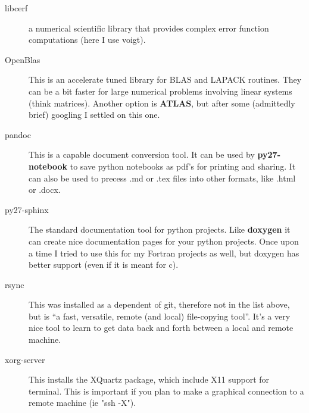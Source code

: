\documentclass[11pt, A4paper]{article}
\begin{document}
\begin{description}
\item[libcerf] a numerical scientific library that provides complex error function computations (here I use voigt).

\item[OpenBlas] This is an accelerate tuned library for BLAS and LAPACK routines. 
They can be a bit faster for large numerical problems involving linear systems (think matrices). 
Another option is {\bf ATLAS}, but after some (admittedly brief) googling I settled on this one. 

\item[pandoc] This is a capable document conversion tool. 
It can be used by {\bf py27-notebook} to save python notebooks as pdf's for printing and sharing. 
It can also be used to precess .md or .tex files into other formats, like .html or .docx.

\item[py27-sphinx] The standard documentation tool for python projects. 
Like {\bf doxygen} it can create nice documentation pages for your python projects. 
Once upon a time I tried to use this for my Fortran projects as well, but doxygen has better support (even if it is meant for c).

\item[rsync] This was installed as a dependent of git, therefore not in the list above, but is ``a fast, versatile, remote (and local) file-copying tool''. 
It's a very nice tool to learn to get data back and forth between a local and remote machine.

\item[xorg-server] This installs the XQuartz package, which include X11 support for terminal. 
This is important if you plan to make a graphical connection to a remote machine (ie "ssh -X"). 
\end{description}

%
%
\end{document}
